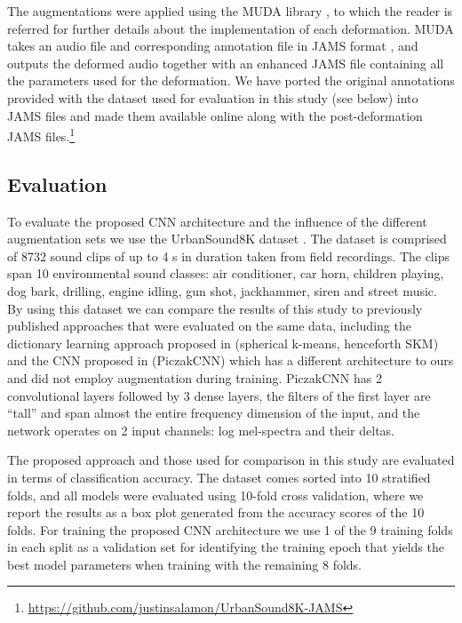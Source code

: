 \documentclass[journal,pdf]{IEEEtran}
\begin{document}
The augmentations were applied using the MUDA library \cite{McFee:Augmentation:ISMIR:15}, to which the reader is referred for further details about the implementation of each deformation. MUDA takes an audio file and corresponding annotation file in JAMS format \cite{Humphrey:JAMS:ISMIR:14,McFee:JAMS:TECH:15}, and outputs the deformed audio together with an enhanced JAMS file containing all the parameters used for the deformation. We have ported the original annotations provided with the  dataset used for evaluation in this study (see below) into JAMS files and made them available online along with the post-deformation JAMS files.\footnote{\url{https://github.com/justinsalamon/UrbanSound8K-JAMS}}

\subsection{Evaluation}
\label{sec:method:evaluation}

To evaluate the proposed CNN architecture and the influence of the different augmentation sets we use the UrbanSound8K dataset \cite{Salamon:UrbanSound:ACMMM:14}. The dataset is comprised of 8732 sound clips of up to 4 s in duration taken from field recordings. The clips span 10 environmental sound classes: air conditioner, car horn, children playing, dog bark, drilling, engine idling, gun shot, jackhammer, siren and street music. By using this dataset we can compare the results of this study to previously published approaches that were evaluated on the same data, including the dictionary learning approach proposed in \cite{Salamon:UnsupervisedUrban:ICASSP:15} (spherical k-means, henceforth SKM) and the CNN proposed in \cite{Piczak:EnvSoundCNN:MLSP:15} (PiczakCNN) which has a different architecture to ours and did not employ augmentation during training.
PiczakCNN has 2 convolutional layers followed by 3 dense layers, the filters of the first layer are ``tall'' and span almost the entire frequency dimension of the input, and the network operates on 2 input channels: log mel-spectra and their deltas.

The proposed approach and those used for comparison in this study are evaluated in terms of classification accuracy. The dataset comes sorted into 10 stratified folds, and all models were evaluated using 10-fold cross validation, where we report the results as a box plot generated from the accuracy scores of the 10 folds. For training the proposed CNN architecture we use 1 of the 9 training folds in each split as a validation set for identifying the training epoch that yields the best model parameters when training with the remaining 8 folds.
\end{document}
